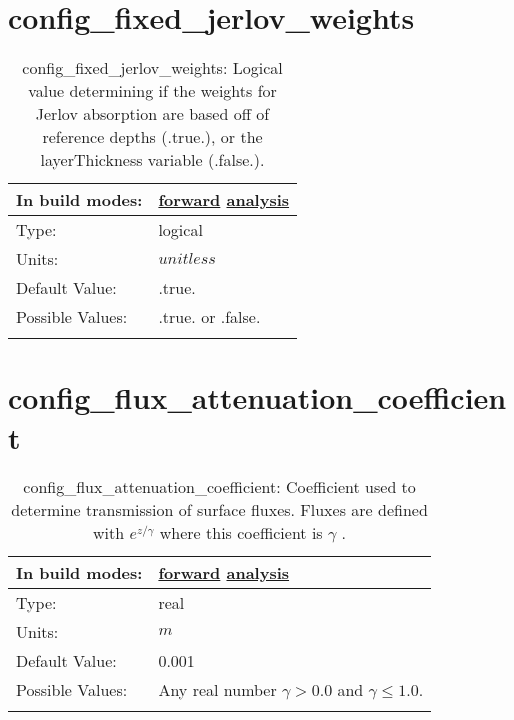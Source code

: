 \section[config\_fixed\_jerlov\_weights]{config\_fixed\_jerlov\_weights}
\label{sec:nm_sec_config_fixed_jerlov_weights}
\begin{center}
\begin{longtable}{| p{2.0in} || p{4.0in} |}
    \hline
    In build modes: & \hyperref[subsec:forward_nm_tab_forcing]{forward} \hyperref[subsec:analysis_nm_tab_forcing]{analysis} \\
    \hline
    Type: & logical \\
    \hline
    Units: & $unitless$ \\
    \hline
    Default Value: & .true. \\
    \hline
    Possible Values: & .true. or .false. \\
    \hline
    \caption{config\_fixed\_jerlov\_weights: Logical value determining if the weights for Jerlov absorption are based off of reference depths (.true.), or the layerThickness variable (.false.).}
\end{longtable}
\end{center}
\section[config\_flux\_attenuation\_coefficient]{config\_flux\_attenuation\_coefficient}
\label{sec:nm_sec_config_flux_attenuation_coefficient}
\begin{center}
\begin{longtable}{| p{2.0in} || p{4.0in} |}
    \hline
    In build modes: & \hyperref[subsec:forward_nm_tab_forcing]{forward} \hyperref[subsec:analysis_nm_tab_forcing]{analysis} \\
    \hline
    Type: & real \\
    \hline
    Units: & $m$ \\
    \hline
    Default Value: & 0.001 \\
    \hline
    Possible Values: & Any real number $\gamma>0.0$ and $\gamma \le 1.0$. \\
    \hline
    \caption{config\_flux\_attenuation\_coefficient:  Coefficient used to determine transmission of surface fluxes. Fluxes are defined with  $e^{z/\gamma}$  where this coefficient is  $\gamma$ .}
\end{longtable}
\end{center}
